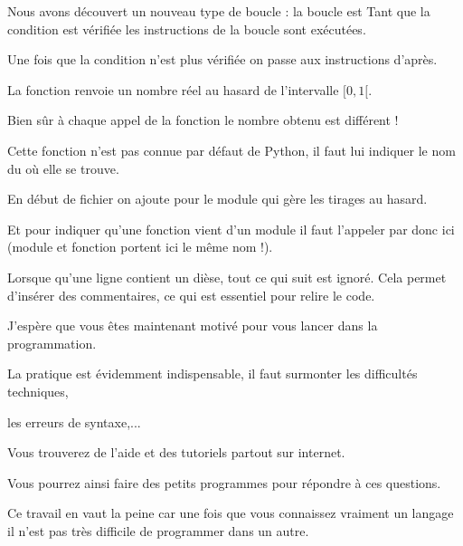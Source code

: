  Nous avons découvert un nouveau type de boucle : 
 la boucle est  Tant que la condition est vérifiée 
  les instructions de la boucle sont exécutées.
 
 
Une fois que la condition n'est plus vérifiée on passe aux instructions d'après.

  \change
  
 La fonction  renvoie un nombre réel au hasard 
 de l'intervalle $[0,1[$.   
 
 Bien sûr à chaque appel de la fonction  
 le nombre obtenu est différent !

  \change
  
Cette fonction n'est pas connue par défaut de Python, 
il faut lui indiquer le nom du  où elle se trouve.


  En début de fichier on ajoute  pour le module 
  qui gère les tirages au hasard. 
  
  Et pour indiquer 
  qu'une fonction vient d'un module il faut l’appeler par  donc ici 
  (module et fonction portent ici le même nom !).
  

  \change
  
Lorsque qu'une ligne contient un dièse, 
tout ce qui suit est ignoré. Cela permet
  d'insérer des commentaires, ce qui est essentiel pour relire le code.
  

\diapo

J’espère que vous êtes maintenant motivé pour vous lancer dans la programmation.

La pratique est évidemment indispensable, il faut surmonter les difficultés techniques,

les erreurs de syntaxe,...

Vous trouverez de l'aide et des tutoriels partout sur internet.

Vous pourrez ainsi faire des petits programmes pour répondre à ces questions.


Ce travail en vaut la peine car une fois que vous connaissez vraiment 
un langage il n'est pas très difficile de programmer dans un autre.


